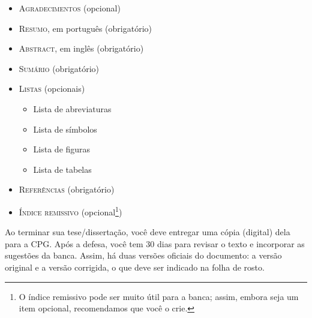 \begin{itemize}
  \item \textsc{Agradecimentos} (opcional)

  \item \textsc{Resumo}, em português (obrigatório)

  \item \textsc{Abstract}, em inglês (obrigatório)

  \item \textsc{Sumário} (obrigatório)

  \item \textsc{Listas} (opcionais)
  \begin{itemize}
    \item Lista de abreviaturas
    \item Lista de símbolos
    \item Lista de figuras
    \item Lista de tabelas
  \end{itemize}

  \item \textsc{Referências} (obrigatório)

  \item \textsc{Índice remissivo} (opcional\footnote{O índice remissivo
   pode ser muito útil para a banca; assim, embora seja um item opcional,
   recomendamos que você o crie.})
\end{itemize}

\enlargethispage{-1\baselineskip}

Ao terminar sua tese/dissertação, você deve entregar uma cópia (digital) dela
para a CPG. Após a defesa, você tem 30 dias para revisar o texto e incorporar
as sugestões da banca. Assim, há duas versões oficiais do documento: a versão
original e a versão corrigida, o que deve ser indicado na folha de rosto.

